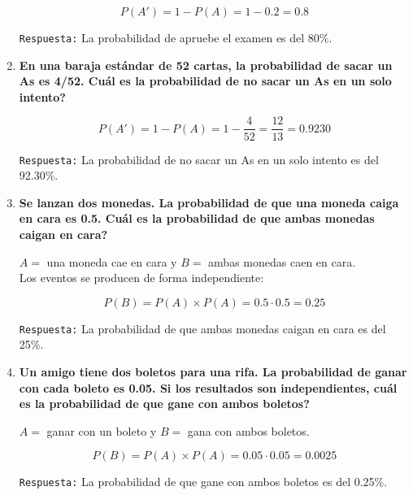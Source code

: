 \documentclass[12pt]{article}
\begin{document}
\begin{enumerate}[label=\textbf{\arabic*.}]
        \[P(A') = 1 - P(A) = 1 - 0.2 = 0.8\]

        \texttt{Respuesta:} La probabilidad de apruebe el examen es del 80\%.


        
        \item \textbf{En una baraja estándar de 52 cartas, la probabilidad de sacar un As es 4/52.
        \textquestiondown Cuál es la probabilidad de no sacar un As en un solo intento?}

        \[P(A') = 1 - P(A) = 1 - \frac{4}{52} = \frac{12}{13} = 0.9230\]

        \texttt{Respuesta:} La probabilidad de no sacar un As en un solo intento es del 92.30\%.



        \item \textbf{Se lanzan dos monedas. La probabilidad de que una moneda caiga en cara es
        0.5. \textquestiondown Cuál es la probabilidad de que ambas monedas caigan en cara?}
        
        $A = $ una moneda cae en cara y $B = $ ambas monedas caen en cara.\\

        Los eventos se producen de forma independiente:

        \[P(B) = P(A) \times P(A) = 0.5 \cdot 0.5 = 0.25\]

        \texttt{Respuesta:} La probabilidad de que ambas monedas caigan en cara es del 25\%.



        \newpage
        \item \textbf{Un amigo tiene dos boletos para una rifa. La probabilidad de ganar con cada
        boleto es 0.05. Si los resultados son independientes, \textquestiondown cuál es la probabilidad de
        que gane con ambos boletos?}

        $A = $ ganar con un boleto y $B = $ gana con ambos boletos.

        \[P(B) = P(A) \times P(A) = 0.05 \cdot 0.05 = 0.0025\]

        \texttt{Respuesta:} La probabilidad de que gane con ambos boletos es del 0.25\%.
        



\end{enumerate}
\end{document}

